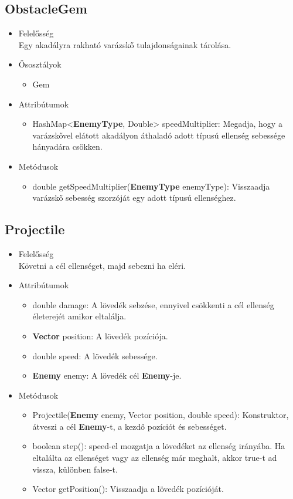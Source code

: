 \subsection{ObstacleGem}
\begin{itemize}
\item Felelősség\\
Egy akadályra rakható varázskő tulajdonságainak tárolása.
\item Ősosztályok
	\begin{itemize}
		\item Gem
	\end{itemize}
\item Attribútumok
	\begin{itemize}
		\item HashMap<\textbf{EnemyType}, Double> speedMultiplier: Megadja, hogy a varázskővel elátott akadályon áthaladó adott típusú ellenség sebessége hányadára csökken.
	\end{itemize}
\item Metódusok
	\begin{itemize}
		\item double getSpeedMultiplier(\textbf{EnemyType} enemyType): Visszaadja varázskő sebesség szorzóját egy adott típusú ellenséghez.
	\end{itemize}
\end{itemize}


\subsection{Projectile}
\begin{itemize}
\item Felelősség\\
Követni a cél ellenséget, majd sebezni ha eléri.
\item Attribútumok
	\begin{itemize}
		\item double damage: A lövedék sebzése, ennyivel csökkenti a cél ellenség életerejét amikor eltalálja.
		\item \textbf{Vector} position: A lövedék pozíciója.
		\item double speed: A lövedék sebessége.
		\item \textbf{Enemy} enemy: A lövedék cél \textbf{Enemy}-je.
	\end{itemize}
\item Metódusok
	\begin{itemize}
		\item Projectile(\textbf{Enemy} enemy, Vector position, double speed): Konstruktor, átveszi a cél \textbf{Enemy}-t, a kezdő pozíciót és sebességet.
		\item boolean step():  speed-el mozgatja a lövedéket az ellenség irányába. Ha eltalálta az ellenséget vagy az ellenség már meghalt, akkor true-t ad vissza, különben false-t.
		\item Vector getPosition(): Visszaadja a lövedék pozícióját.
	\end{itemize}
\end{itemize}



